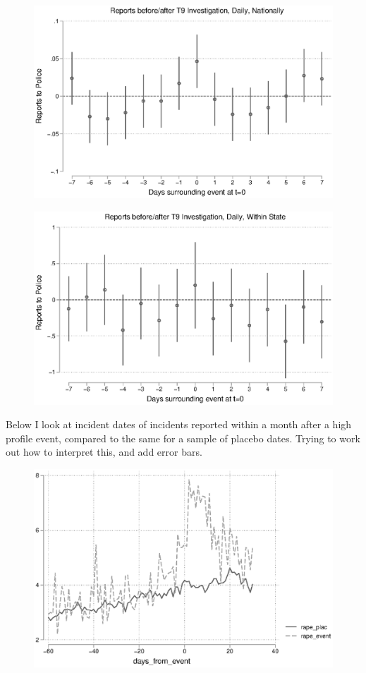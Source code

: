 \documentclass[AER,draftmode]{AEA}
\begin{document}
\begin{figure}
\includegraphics[width=\linewidth]{figures/police_national_cases.eps}
\end{figure}

\begin{figure}
\includegraphics[width=\linewidth]{figures/police_state_cases.eps}
\end{figure}

\clearpage
Below I look at incident dates of incidents reported within a month after a high profile event, compared to the same for a sample of placebo dates. Trying to work out how to interpret this, and add error bars. 

\begin{figure}
\includegraphics[width=\linewidth]{figures/idt_analysis_2.eps}
\end{figure}
\end{document}
